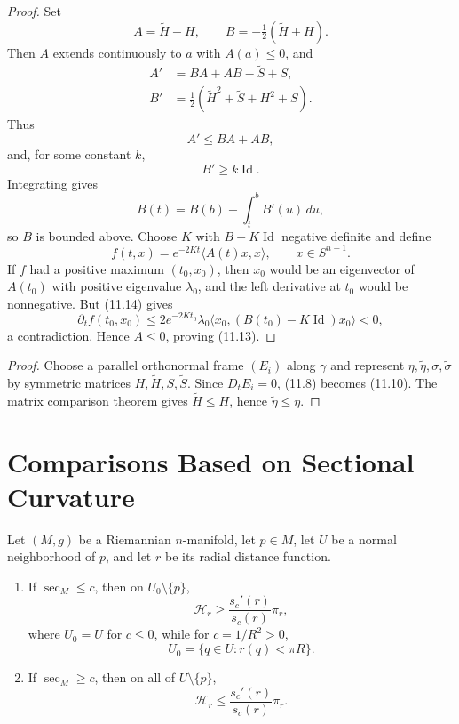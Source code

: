 \begin{proof}
\sketch
Set
\[
A=\widetilde H-H,
\qquad
B=-\tfrac12(\widetilde H+H).
\]
Then $A$ extends continuously to $a$ with $A(a)\leq0$, and
\begin{align*}
A'&=BA+AB-\widetilde S+S,\\
B'&=\tfrac12(\widetilde H^2+\widetilde S+H^2+S).
\end{align*}
Thus
\begin{equation}
A'\leq BA+AB, \tag{11.14}
\end{equation}
and, for some constant $k$,
\begin{equation}
B'\geq k\operatorname{Id}. \tag{11.15}
\end{equation}
Integrating gives
\begin{equation}
B(t)=B(b)-\int_t^bB'(u)\,du, \tag{11.16}
\end{equation}
so $B$ is bounded above.  Choose $K$ with $B-K\operatorname{Id}$ negative
definite and define
\[
f(t,x)=e^{-2Kt}\langle A(t)x,x\rangle,
\qquad x\in S^{n-1}.
\]
If $f$ had a positive maximum $(t_0,x_0)$, then $x_0$ would be an eigenvector
of $A(t_0)$ with positive eigenvalue $\lambda_0$, and the left derivative at
$t_0$ would be nonnegative.  But (11.14) gives
\[
\partial_tf(t_0,x_0)
\leq2e^{-2Kt_0}\lambda_0
\langle x_0,(B(t_0)-K\operatorname{Id})x_0\rangle<0,
\]
a contradiction.  Hence $A\leq0$, proving (11.13).
\end{proof}

\begin{proof}
\sketch
Choose a parallel orthonormal frame $(E_i)$ along $\gamma$ and represent
$\eta,\widetilde\eta,\sigma,\widetilde\sigma$ by symmetric matrices
$H,\widetilde H,S,\widetilde S$.  Since $D_tE_i=0$, (11.8) becomes (11.10).
The matrix comparison theorem gives $\widetilde H\leq H$, hence
$\widetilde\eta\leq\eta$.
\end{proof}
\section{Comparisons Based on Sectional Curvature}

\begin{theorem}
\label{thm:hessian-comparison}
Let $(M,g)$ be a Riemannian $n$-manifold, let $p\in M$, let $U$ be a normal
neighborhood of $p$, and let $r$ be its radial distance function.
\begin{enumerate}
\item[(a)] If $\sec_M\leq c$, then on $U_0\setminus\{p\}$,
\begin{equation}
\mathcal H_r\geq\frac{s_c'(r)}{s_c(r)}\pi_r, \tag{11.17}
\end{equation}
where $U_0=U$ for $c\leq0$, while for $c=1/R^2>0$,
\[
U_0=\{q\in U:r(q)<\pi R\}.
\]
\item[(b)] If $\sec_M\geq c$, then on all of $U\setminus\{p\}$,
\begin{equation}
\mathcal H_r\leq\frac{s_c'(r)}{s_c(r)}\pi_r. \tag{11.18}
\end{equation}
\end{enumerate}
\end{theorem}


